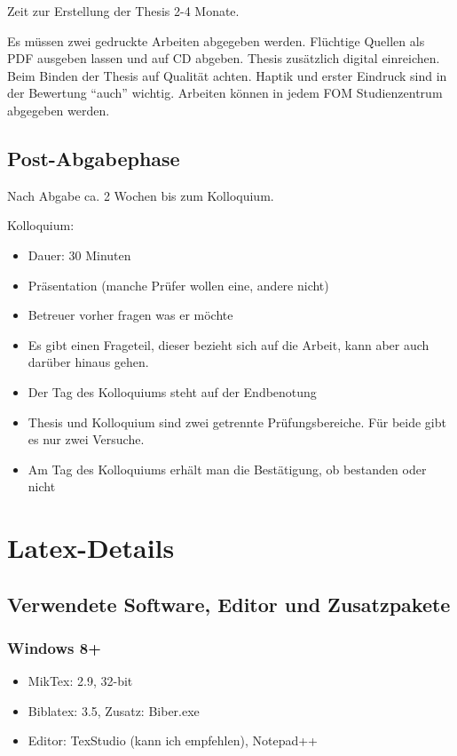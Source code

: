 \documentclass[12pt,oneside,titlepage]{scrartcl}
\begin{document}
Zeit zur Erstellung der Thesis 2-4 Monate.

Es müssen zwei gedruckte Arbeiten abgegeben werden. Flüchtige Quellen als PDF ausgeben lassen und auf CD abgeben. Thesis zusätzlich digital einreichen. Beim Binden der Thesis auf Qualität achten. Haptik und erster Eindruck sind in der Bewertung \enquote{auch} wichtig. Arbeiten können in jedem FOM Studienzentrum abgegeben werden.

\subsection{Post-Abgabephase}
Nach Abgabe ca. 2 Wochen bis zum Kolloquium.

Kolloquium:
\begin{itemize}
\item Dauer: 30 Minuten
\item Präsentation (manche Prüfer wollen eine, andere nicht)
\item Betreuer vorher fragen was er möchte
\item Es gibt einen Frageteil, dieser bezieht sich auf die Arbeit, kann aber auch darüber hinaus gehen.
\item Der Tag des Kolloquiums steht auf der Endbenotung
\item Thesis und Kolloquium sind zwei getrennte Prüfungsbereiche. Für beide gibt es nur zwei Versuche.
\item Am Tag des Kolloquiums erhält man die Bestätigung, ob bestanden oder nicht
\end{itemize}


\newpage
\section{Latex-Details} \label{latexDetails}

\subsection{Verwendete Software, Editor und Zusatzpakete}
\subsubsection{Windows 8+}
\begin{itemize}
\item MikTex: 2.9, 32-bit
\item Biblatex: 3.5, Zusatz: Biber.exe
\item Editor: TexStudio (kann ich empfehlen), Notepad++
\end{itemize}
\end{document}
